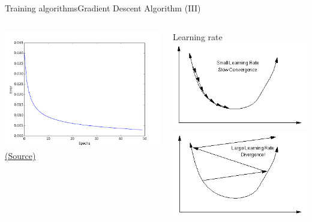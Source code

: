 \documentclass[10pt,compress]{beamer} %
\begin{document}
\begin{frame}{Training algorithms}{Gradient Descent Algorithm (III)}
	\begin{columns}
	\begin{center}
	\includegraphics[width=\linewidth]{figs/nn_learncurve.png}\\
	\scriptsize \href{http://sujitpal.blogspot.com.es/2014/07/handwritten-digit-recognition-with.html}{(Source)}
	\end{center}
	\vspace{-0.5cm}
	\begin{center}
    Learning rate\\
	\includegraphics[width=0.8\linewidth]{figs/nn_learning.png}\\
	\includegraphics[width=0.8\linewidth]{figs/nn_learning2.png}\\

\end{center}
\end{columns}
\end{frame}
\end{document}
